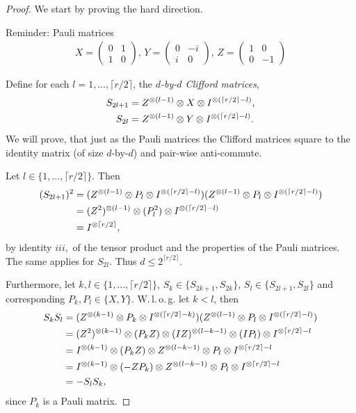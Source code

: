 	\begin{proof}
		We start by proving the hard direction. 
		
		Reminder: Pauli matrices
		\begin{align*}
			X = \begin{pmatrix}
			0 & 1 \\ 1 & 0
			\end{pmatrix}, \, Y = \begin{pmatrix}
			0 & -i \\ i & 0
			\end{pmatrix}, \, Z = \begin{pmatrix}
			1 & 0 \\ 0 & -1
			\end{pmatrix}
		\end{align*}
				
		Define for each $l=1,\dots,\lceil r/2\rceil$, the \emph{$d$-by-$d$ Clifford matrices},
		\begin{align}
			S_{2l+1} &= Z^{\otimes (l-1)} \otimes X \otimes I^{\otimes(\lceil r/2\rceil - l)},\\
			S_{2l} &= Z^{\otimes (l-1)} \otimes Y \otimes I^{\otimes(\lceil r/2\rceil - l)}.
		\end{align}
		We will prove, that just as the Pauli matrices the Clifford matrices square to the identity matrix (of size $d$-by-$d$) and pair-wise anti-commute. 
	
		Let $l\in\{1,\dots,\lceil r/2\rceil\}$. Then
		\begin{align*}
			(S_{2l+1})^2 &= (Z^{\otimes (l-1)} \otimes P_l \otimes I^{\otimes(\lceil r/2\rceil - l)}) (Z^{\otimes (l-1)} \otimes P_l \otimes I^{\otimes(\lceil r/2\rceil - l)}) \\
			&= (Z^2)^{\otimes (l-1)} \otimes (P_l^2) \otimes I^{\otimes (\lceil r/2 \rceil -l)} \\
			&= I^{\otimes \lceil r/2 \rceil},
		\end{align*}
		by identity $iii,$ of the tensor product and the properties of the Pauli matrices. The same applies for $S_{2l}$. Thus $d\leq 2^{\lceil r/2 \rceil}$.
		
		Furthermore, let $k,l\in\{1,\dots, \lceil r/2 \rceil\}$, $S_k\in\{S_{2k+1},S_{2k}\}$, $S_l\in\{S_{2l+1},S_{2l}\}$ and corresponding $P_k,P_l\in\{X,Y\}$. W.\,l.\,o.\,g. let $k<l$, then
		\begin{align*}
			S_{k}S_{l} &= (Z^{\otimes (k-1)} \otimes P_k \otimes I^{\otimes(\lceil r/2\rceil - k)})(Z^{\otimes (l-1)} \otimes P_l \otimes I^{\otimes(\lceil r/2\rceil - l)})\\
			&=(Z^2)^{\otimes (k-1)} \otimes (P_k Z) \otimes (I Z)^{\otimes (l-k-1)} \otimes (I P_l) \otimes I^{\otimes \lceil r/2\rceil -l} \\
			&= I^{\otimes (k-1)} \otimes (P_k Z) \otimes Z^{\otimes (l-k-1)} \otimes P_l \otimes I^{\otimes \lceil r/2\rceil -l}\\
			&= I^{\otimes (k-1)} \otimes (- Z P_k) \otimes Z^{\otimes (l-k-1)} \otimes P_l \otimes I^{\otimes \lceil r/2\rceil -l} \\
			&= - S_lS_k,
		\end{align*}
		since $P_k$ is a Pauli matrix.
		

\end{proof}
